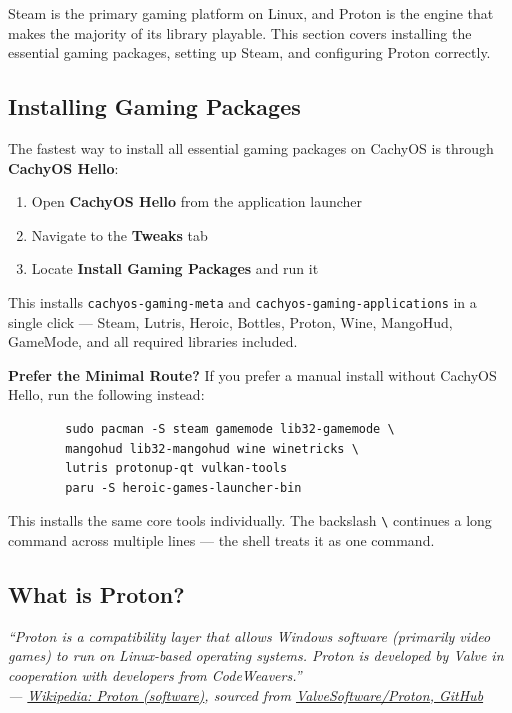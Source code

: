 \documentclass{article}
\newcommand{\code}[1]{\colorbox{codebg}{\texttt{#1}}}
\begin{document}
Steam is the primary gaming platform on Linux, and Proton is the engine that makes
the majority of its library playable. This section covers installing the essential
gaming packages, setting up Steam, and configuring Proton correctly.

\subsection{Installing Gaming Packages}

The fastest way to install all essential gaming packages on CachyOS is through
\textbf{CachyOS Hello}:

\begin{enumerate}[leftmargin=1.5em, nosep, label={\arabic*.}]
	\item Open \textbf{CachyOS Hello} from the application launcher
	\item Navigate to the \textbf{Tweaks} tab
	\item Locate \textbf{Install Gaming Packages} and run it
\end{enumerate}

This installs \code{cachyos-gaming-meta} and \code{cachyos-gaming-applications} in
a single click --- Steam, Lutris, Heroic, Bottles, Proton, Wine, MangoHud, GameMode,
and all required libraries included.

\begin{callout}{\textbf{Prefer the Minimal Route?}}
	If you prefer a manual install without CachyOS Hello, run the following instead:
	\begin{verbatim}
		sudo pacman -S steam gamemode lib32-gamemode \
		mangohud lib32-mangohud wine winetricks \
		lutris protonup-qt vulkan-tools
		paru -S heroic-games-launcher-bin
	\end{verbatim}
	This installs the same core tools individually. The backslash \code{\textbackslash}
	continues a long command across multiple lines --- the shell treats it as one
	command.
\end{callout}

\subsection{What is Proton?}

\begin{mdframed}[linewidth=1.5pt, linecolor=black!50, topline=true, bottomline=true,
	leftline=false, rightline=false, backgroundcolor=black!3]
	\small\itshape
	``Proton is a compatibility layer that allows Windows software (primarily video
	games) to run on Linux-based operating systems. Proton is developed by Valve
	in cooperation with developers from CodeWeavers.''\\[4pt]
	\normalfont\small ---
	\href{https://en.wikipedia.org/wiki/Proton_(software)}{Wikipedia: Proton
		(software)}, sourced from
	\href{https://github.com/ValveSoftware/Proton}{ValveSoftware/Proton, GitHub}
\end{mdframed}
\end{document}
